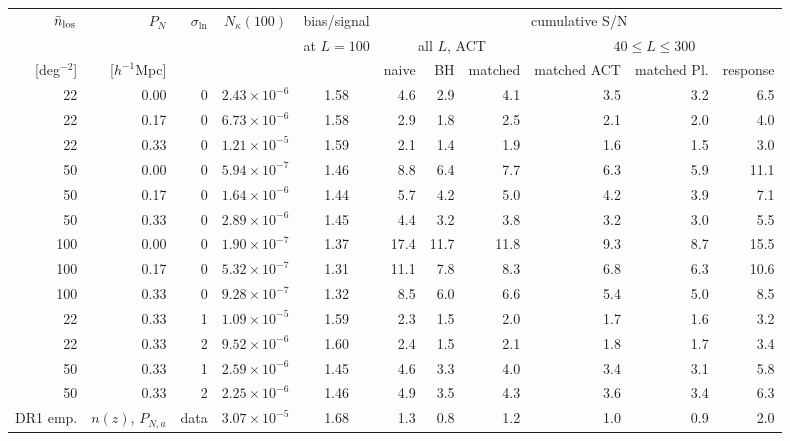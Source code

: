 \footnotesize\setlength{\tabcolsep}{3pt}
\begin{tabular}{rrrccrrrrrr}
\toprule
$\bar n_{\rm los}$ & $P_N$ & $\sigma_{\ln}$ & $N_\kappa(100)$ & bias/signal & \multicolumn{6}{c}{cumulative S/N}\\
 & & & & at $L=100$ & \multicolumn{3}{c}{all $L$, ACT} & \multicolumn{3}{c}{$40\le L\le300$}\\
{}[deg$^{-2}$] & [$h^{-1}$Mpc] & & & & naive & BH & matched & matched ACT & matched Pl. & response\\
\midrule
22 & 0.00 & 0 & $2.43\times10^{-6}$ & 1.58 & 4.6 & 2.9 & 4.1 & 3.5 & 3.2 & 6.5\\
22 & 0.17 & 0 & $6.73\times10^{-6}$ & 1.58 & 2.9 & 1.8 & 2.5 & 2.1 & 2.0 & 4.0\\
22 & 0.33 & 0 & $1.21\times10^{-5}$ & 1.59 & 2.1 & 1.4 & 1.9 & 1.6 & 1.5 & 3.0\\
50 & 0.00 & 0 & $5.94\times10^{-7}$ & 1.46 & 8.8 & 6.4 & 7.7 & 6.3 & 5.9 & 11.1\\
50 & 0.17 & 0 & $1.64\times10^{-6}$ & 1.44 & 5.7 & 4.2 & 5.0 & 4.2 & 3.9 & 7.1\\
50 & 0.33 & 0 & $2.89\times10^{-6}$ & 1.45 & 4.4 & 3.2 & 3.8 & 3.2 & 3.0 & 5.5\\
100 & 0.00 & 0 & $1.90\times10^{-7}$ & 1.37 & 17.4 & 11.7 & 11.8 & 9.3 & 8.7 & 15.5\\
100 & 0.17 & 0 & $5.32\times10^{-7}$ & 1.31 & 11.1 & 7.8 & 8.3 & 6.8 & 6.3 & 10.6\\
100 & 0.33 & 0 & $9.28\times10^{-7}$ & 1.32 & 8.5 & 6.0 & 6.6 & 5.4 & 5.0 & 8.5\\
22 & 0.33 & 1 & $1.09\times10^{-5}$ & 1.59 & 2.3 & 1.5 & 2.0 & 1.7 & 1.6 & 3.2\\
22 & 0.33 & 2 & $9.52\times10^{-6}$ & 1.60 & 2.4 & 1.5 & 2.1 & 1.8 & 1.7 & 3.4\\
50 & 0.33 & 1 & $2.59\times10^{-6}$ & 1.45 & 4.6 & 3.3 & 4.0 & 3.4 & 3.1 & 5.8\\
50 & 0.33 & 2 & $2.25\times10^{-6}$ & 1.46 & 4.9 & 3.5 & 4.3 & 3.6 & 3.4 & 6.3\\
DR1 emp. & $n(z)$, $P_{N,a}$ & data & $3.07\times10^{-5}$ & 1.68 & 1.3 & 0.8 & 1.2 & 1.0 & 0.9 & 2.0\\
\bottomrule
\end{tabular}
